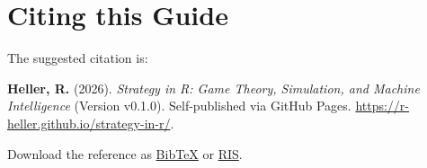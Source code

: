 \documentclass[
]{article}
\author{}
\date{\vspace{-2.5em}}
\begin{document}
\section*{Citing this Guide}\label{citing-this-guide}

The suggested citation is:

\begin{boxempty}
\textbf{Heller, R.} (2026). \emph{Strategy in R: Game Theory,
Simulation, and Machine Intelligence} (Version v0.1.0). Self-published
via GitHub Pages. \url{https://r-heller.github.io/strategy-in-r/}.
\end{boxempty}

Download the reference as \href{citation-files/citation.bib}{BibTeX} or
\href{citation-files/citation.ris}{RIS}.
\end{document}
